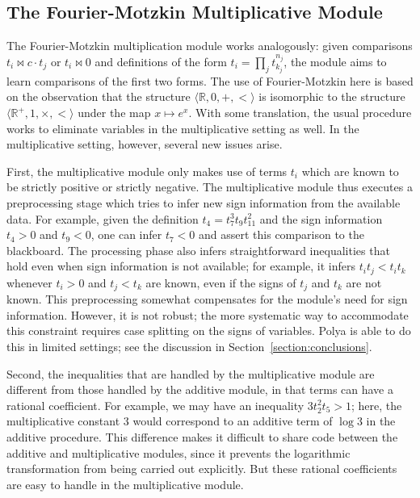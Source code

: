 \documentclass[runningheds]{llncs}
\newcommand{\RR}{\mathbb{R}}
\begin{document}
\subsection{The Fourier-Motzkin Multiplicative Module}
\label{subsection:fm:multiplicative}

The Fourier-Motzkin multiplication module works analogously: given comparisons $t_i \bowtie c \cdot t_j$ or $t_i \bowtie 0$ and definitions of the form $t_i = \prod_j t_{k_j}^{n_j}$, the module aims to learn comparisons of the first two forms. The use of Fourier-Motzkin here is based on the observation that the structure $\langle \RR, 0, +, < \rangle$ is isomorphic to the structure $\langle \RR^+, 1, \times, < \rangle$ under the map $x \mapsto e^x$. With some translation, the usual procedure works to eliminate variables in the multiplicative setting as well. In the multiplicative setting, however, several new issues arise.

First, the multiplicative module only makes use of terms $t_i$ which are known to be strictly positive or strictly negative. The multiplicative module thus executes a preprocessing stage which tries to infer new sign information from the available data. For example, given the definition $t_4 = t_7^3 t_9 t_{11}^2$ and the sign information $t_4 > 0$ and $t_9 < 0$, one can infer $t_7 < 0$ and assert this comparison to the blackboard. The processing phase also infers straightforward inequalities that hold even when sign information is not available; for example, it infers $t_i t_j < t_i t_k$ whenever $t_i > 0$ and $t_j < t_k$ are known, even if the signs of $t_j$ and $t_k$ are not known. This preprocessing somewhat compensates for the module's need for sign information. However, it is not robust; the more systematic way to accommodate this constraint requires case splitting on the signs of variables. Polya is able to do this in limited settings; see the discussion in Section~\ref{section:conclusions}.



Second, the inequalities that are handled by the multiplicative module
are different from those handled by the additive module, in that terms can have a rational coefficient. For example, we may have an inequality $3 t_2^2 t_5 > 1$; here, the multiplicative constant $3$ would correspond to an additive term of $\log 3$ in the additive procedure. This difference makes it difficult to share code between the additive and multiplicative modules, since it prevents the logarithmic transformation from being carried out explicitly. But these rational coefficients are easy to handle in the multiplicative module. 
\end{document}
